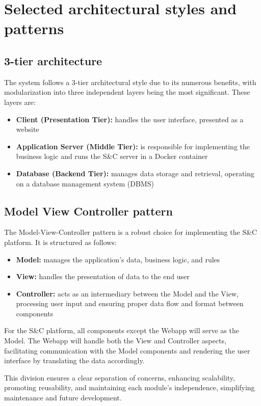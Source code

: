 \newpage

\section{Selected architectural styles and patterns}

\subsection{3-tier architecture}
The system follows a 3-tier architectural style due to its numerous benefits, with modularization into three independent layers being the most significant. These layers are:  

\begin{itemize}
    \item \textbf{Client (Presentation Tier):} handles the user interface, presented as a website
    \item \textbf{Application Server (Middle Tier):} is responsible for implementing the business logic and runs the S\&C server in a Docker container
    \item \textbf{Database (Backend Tier):} manages data storage and retrieval, operating on a database management system (DBMS)
\end{itemize}

\subsection{Model View Controller pattern}
The Model-View-Controller pattern is a robust choice for implementing the S\&C platform. It is structured as follows:
\begin{itemize}
    \item \textbf{Model:} manages the application’s data, business logic, and rules
    \item \textbf{View:} handles the presentation of data to the end user
    \item \textbf{Controller:} acts as an intermediary between the Model and the View, processing user input and ensuring proper data flow and format between components
\end{itemize}

For the S\&C platform, all components except the Webapp will serve as the Model. The Webapp will handle both the View and Controller aspects, facilitating communication with the Model components and rendering the user interface by translating the data accordingly. 

This division ensures a clear separation of concerns, enhancing scalability, promoting reusability, and maintaining each module's independence, simplifying maintenance and future development.

